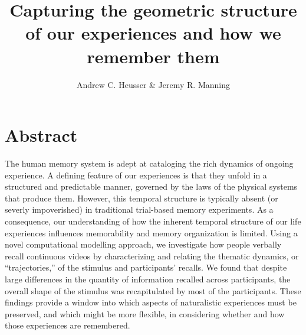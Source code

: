 \documentclass{article}
\title{Capturing the geometric structure of our experiences and how we remember them}
\author{Andrew C. Heusser \& Jeremy R. Manning}
\begin{document}
\maketitle

\section{Abstract}
{
The human memory system is adept at cataloging the rich dynamics of ongoing experience. A defining feature of our experiences is that they unfold in a structured and predictable manner, governed by the laws of the physical systems that produce them. However, this temporal structure is typically absent (or severly impoverished) in traditional trial-based memory experiments. As a consequence, our understanding of how the inherent temporal structure of our life experiences influences memorability and memory organization is limited. Using a novel computational modelling approach, we investigate how people verbally recall continuous videos by characterizing and relating the thematic dynamics, or ``trajectories,'' of the stimulus and participants' recalls. We found that despite large differences in the quantity of information recalled across participants, the overall shape of the stimulus was recapitulated by most of the participants. These findings provide a window into which aspects of naturalistic experiences must be preserved, and which might be more flexible, in considering whether and how those experiences are remembered.


}
\end{document}
